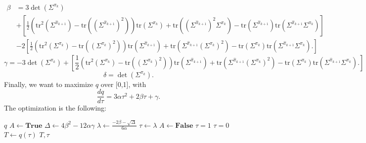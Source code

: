 \documentclass{article}
\newcommand{\1}{\mathbf{1}}
\theoremstyle{definition}
\theoremstyle{remark}
\begin{document}
\begin{appendices}
\begin{multline*}
\end{multline*}
\begin{align*}
    \beta &=  
    3\det(\Sigma^{\pi_{k}}) \\
    &+\left[\frac{1}{2}(\mathrm{tr}^2(\Sigma^{\hat{\pi}_{k+1}})-\mathrm{tr}((\Sigma^{\hat{\pi}_{k+1}})^2))\mathrm{tr}(\Sigma^{\pi_{k}})+\mathrm{tr}((\Sigma^{\hat{\pi}_{k+1}})^2 \Sigma^{\pi_{k}})-\mathrm{tr}(\Sigma^{\hat{\pi}_{k+1}})\mathrm{tr}(\Sigma^{\hat{\pi}_{k+1}}\Sigma^{\pi_{k}})\right] \\
    &-2\left[\frac{1}{2}(\mathrm{tr}^2(\Sigma^{\pi_{k}})-\mathrm{tr}((\Sigma^{\pi_{k}})^2))\mathrm{tr}(\Sigma^{\hat{\pi}_{k+1}})+\mathrm{tr}(\Sigma^{\hat{\pi}_{k+1}}(\Sigma^{\pi_{k}})^2) - \mathrm{tr}(\Sigma^{\pi_{k}})\mathrm{tr}(\Sigma^{\hat{\pi}_{k+1}}\Sigma^{\pi_{k}}).\right]
\end{align*}
\begin{equation*}
    \gamma = -3\det(\Sigma^{\pi_{k}}) +\left[\frac{1}{2}(\mathrm{tr}^2(\Sigma^{\pi_{k}})-\mathrm{tr}((\Sigma^{\pi_{k}})^2))\mathrm{tr}(\Sigma^{\hat{\pi}_{k+1}})+\mathrm{tr}(\Sigma^{\hat{\pi}_{k+1}}(\Sigma^{\pi_{k}})^2) - \mathrm{tr}(\Sigma^{\pi_{k}})\mathrm{tr}(\Sigma^{\hat{\pi}_{k+1}}\Sigma^{\pi_{k}}).\right]
\end{equation*}
\begin{equation*}
    \delta = 
    \det(\Sigma^{\pi_{k}}). 
\end{equation*}
Finally, we want to maximize $q$ over [0,1], with 
\[\frac{dq}{d\tau}= 3\alpha\tau^2+2\beta\tau+\gamma.\]
The optimization is the following:

\begin{algorithm}
\caption{Line search for the DGW and CGW problems (3D)}\label{alg:FW_dgw}
\begin{algorithmic}[1]
\Require$q$
\State $A\gets\textbf{True}$
\State $\Delta\gets4\beta^2-12\alpha\gamma$
\State $\lambda\gets\frac{-2\beta-\sqrt{\Delta}}{6\alpha}$
\State $\tau\gets \lambda$
\State $A\gets\textbf{False}$
\EndIf
\EndIf
{}
\State $\tau = 1$
\Else
\State $\tau = 0$
\EndIf
\EndIf
\State $T \gets q(\tau)$
\State\Return $T,\tau$
\end{algorithmic}
\end{algorithm}



\end{appendices}
\end{document}
